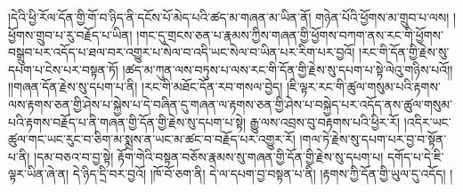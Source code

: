 །དེའི་ཕྱི་རོལ་དོན་གྱི་གོ་བ་ཉིད་ནི་དངོས་པོ་མེད་པའི་ཚད་མ་གཞན་མ་ཡིན་ནོ། གཉེན་པོའི་ཕྱོགས་མ་གྲུབ་པ་ལས། །ཕྱོགས་གྲུབ་པ་རུ་བརྗོད་པ་ཡིན། །གང་དུ་གྲངས་ཅན་པ་རྣམས་ཀྱིས་གཞན་གྱི་ཕྱོགས་བཀག་ནས་རང་གི་ཕྱོགས་བསྒྲུབ་པར་འདོད་པ་ཐལ་བར་འགྱུར་པ་སེལ་བ་འདི་ཡང་སེལ་བ་ཡིན་པར་རིག་པར་བྱའོ། །རང་གི་དོན་གྱི་རྗེས་སུ་དཔག་པ་ངེས་པར་བསྟན་ཏོ། །ཚད་མ་ཀུན་ལས་བཏུས་པ་ལས་རང་གི་དོན་གྱི་རྗེས་སུ་དཔག་པ་སྟེ་ལེའུ་གཉིས་པའོ།། །།གཞན་དོན་རྗེས་སུ་དཔག་པ་ནི། །རང་གི་མཐོང་དོན་རབ་གསལ་བྱེད། །ཇི་ལྟར་རང་གི་ཚུལ་གསུམ་པའི་རྟགས་ལས་རྟགས་ཅན་གྱི་ཤེས་པ་སྐྱེས་པ་དེ་བཞིན་དུ་གཞན་ལ་རྟགས་ཅན་གྱི་ཤེས་པ་བསྐྱེད་པར་འདོད་ནས་ཚུལ་གསུམ་པའི་རྟགས་བརྗོད་པ་ནི་གཞན་གྱི་དོན་གྱི་རྗེས་སུ་དཔག་པ་སྟེ། རྒྱུ་ལས་འབྲས་བུ་བརྟགས་པའི་ཕྱིར་རོ། །འདིར་ཡང་ཚུལ་གང་ཡང་རུང་བ་ཅིག་མ་སྨྲས་ན་ཡང་མ་ཚང་བ་བརྗོད་པར་འགྱུར་རོ། །གལ་ཏེ་རྗེས་སུ་དཔག་པར་བྱ་བ་སྟོན་པ་ནི། །དམ་བཅའ་བ་བྱ་སྟེ། རྟོག་གེའི་བསྟན་བཅོས་རྣམས་སུ་གཞན་གྱི་དོན་གྱི་རྗེས་སུ་དཔག་པ། དགོད་པ་དེ་ཇི་ལྟར་ཡིན་ཞེ་ན། དེ་ཉིད་དྲི་བར་བྱའོ། །ཁོ་བོ་ཅག་ནི། དེ་ལ་དཔག་བྱ་བསྟན་པ་ནི། །རྟགས་ཀྱི་དོན་གྱི་ཡུལ་དུ་འདོད། །

